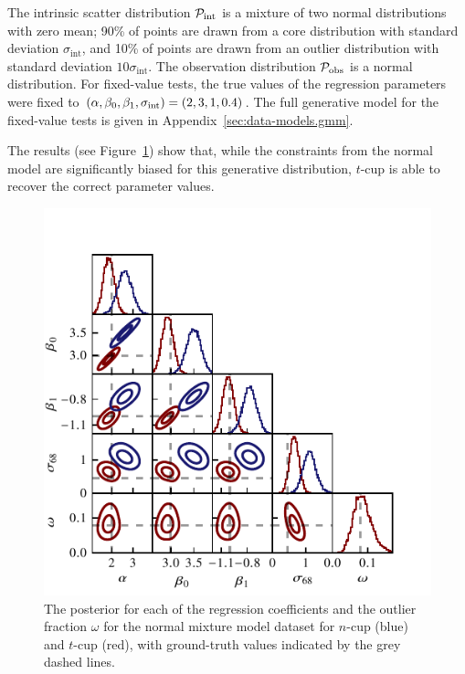 \documentclass[fleqn,usenatbib]{rasti}
\begin{document}
The intrinsic scatter distribution $\mathcal P_{\rm int}$ is a mixture of two
normal distributions with zero mean; 90\% of points are drawn from a core
distribution with standard deviation $\sigma_\textrm{int}$, and 10\% of points
are drawn from an outlier distribution with standard deviation $10
\sigma_\textrm{int}$. The observation distribution $\mathcal P_{\rm obs}$ is a
normal distribution. For fixed-value tests, the true values of the regression
parameters were fixed to $(\alpha, \beta_0, \beta_1, \sigma_{\rm int}) = (2,
3, 1, 0.4)$. The full generative model for the fixed-value tests is given in
Appendix~\ref{sec:data-models.gmm}.

The results (see Figure~\ref{fig:results.gmm.corner}) show that, while the
constraints from the normal model are significantly biased for this generative
distribution, $t$-cup is able to recover the correct parameter values.

\begin{figure}
    \includegraphics[width=\columnwidth]{graphics/fixed/corner_gaussian_mix.pdf}
    \caption{The posterior for each of the regression coefficients and the
    outlier fraction $\omega$ for the normal mixture model dataset for $n$-cup
    (blue) and $t$-cup (red), with ground-truth values indicated by the grey
    dashed lines.}
    \label{fig:results.gmm.corner}
\end{figure}
\end{document}
